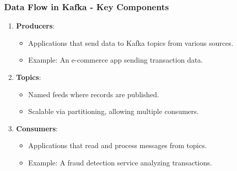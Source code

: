 \documentclass[aspectratio=169]{beamer}
\begin{document}
\begin{frame}[fragile]
    \frametitle{Data Flow in Kafka - Key Components}
    \begin{enumerate}
        \item \textbf{Producers}:
            \begin{itemize}
                \item Applications that send data to Kafka topics from various sources.
                \item Example: An e-commerce app sending transaction data.
            \end{itemize}
        \item \textbf{Topics}:
            \begin{itemize}
                \item Named feeds where records are published.
                \item Scalable via partitioning, allowing multiple consumers.
            \end{itemize}
        \item \textbf{Consumers}:
            \begin{itemize}
                \item Applications that read and process messages from topics.
                \item Example: A fraud detection service analyzing transactions.
            \end{itemize}
    \end{enumerate}
\end{frame}
\end{document}
